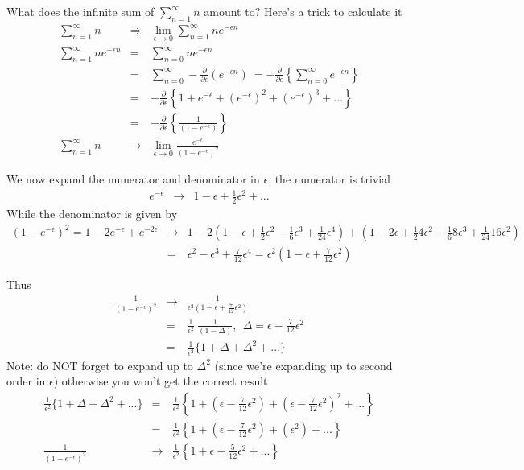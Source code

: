 \documentclass[aps,preprint,preprintnumbers,nofootinbib,showpacs,prd]{revtex4-1}
\newcommand{\nbea}{\begin{eqnarray*}}
\newcommand{\neea}{\end{eqnarray*}}
\begin{document}
What does the infinite sum of $\sum\limits_{n=1}^{\infty} n$ amount to? Here's a trick to calculate it
%
\nbea
\sum_{n=1}^{\infty} n & \Longrightarrow & \lim_{\epsilon \rightarrow 0} \sum_{n=1}^{\infty} n e^{-\epsilon n} \\
\sum_{n=1}^{\infty} n e^{-\epsilon n} & = & \sum_{n=0}^{\infty} n e^{-\epsilon n} \\
& = & \sum_{n=0}^{\infty} -\frac{\partial}{\partial \epsilon} (e^{-\epsilon n}) ~ = -\frac{\partial}{\partial \epsilon} \left \{ \sum_{n=0}^{\infty}  e^{-\epsilon n} \right \} \\
& = & -\frac{\partial}{\partial \epsilon} \left \{ 1 + e^{-\epsilon} + (e^{-\epsilon})^2 + (e^{-\epsilon})^3 + ... \right \} \\
& = & -\frac{\partial}{\partial \epsilon} \left \{ \frac{1}{(1-e^{-\epsilon})} \right \} \\
\sum_{n=1}^{\infty} n & \rightarrow  & \lim_{\epsilon \rightarrow 0} \frac{e^{-\epsilon}}{(1-e^{-\epsilon})^2}
\neea
%

We now expand the numerator and denominator in $\epsilon$, the numerator is trivial
%
\nbea
e^{-\epsilon} & \rightarrow & 1 - \epsilon + \frac{1}{2} \epsilon^2 + ...
\neea
%
While the denominator is given by
%
\nbea
(1-e^{-\epsilon})^2 = 1 - 2e^{-\epsilon} + e^{-2\epsilon} & \rightarrow & 1 - 2 (1 - \epsilon + \frac{1}{2}\epsilon^2 - \frac{1}{6}\epsilon^3 + \frac{1}{24}\epsilon^4) + (1 - 2\epsilon + \frac{1}{2} 4 \epsilon^2 - \frac{1}{6} 8\epsilon^3 + \frac{1}{24}16\epsilon^2) \\
& = & \epsilon^2 - \epsilon^3 + \frac{7}{12} \epsilon^4  = \epsilon^2(1 - \epsilon + \frac{7}{12}\epsilon^2)
\neea
%

Thus
%
\nbea
\frac{1}{(1-e^{-\epsilon})^2} & \rightarrow & \frac{1}{\epsilon^2(1 - \epsilon + \frac{7}{12}\epsilon^2)} \\
& = & \frac{1}{\epsilon^2} ~\frac{1}{(1 - \Delta)}, ~~\Delta = \epsilon - \frac{7}{12}\epsilon^2 \\
& = & \frac{1}{\epsilon^2} \{ 1 + \Delta + \Delta^2 + ... \}
\neea
%
Note: do NOT forget to expand up to $\Delta^2$ (since we're expanding up to second order in $\epsilon$) otherwise you won't get the correct result
%
\nbea
\frac{1}{\epsilon^2} \{ 1 + \Delta + \Delta^2 + ... \} & = & \frac{1}{\epsilon^2} \left \{ 1 + \left( \epsilon - \frac{7}{12}\epsilon^2 \right) + \left( \epsilon - \frac{7}{12}\epsilon^2 \right)^2 + ... \right \} \\
& = & \frac{1}{\epsilon^2} \left \{ 1 + \left( \epsilon - \frac{7}{12}\epsilon^2 \right) + \left( \epsilon^2 \right) + ... \right \} \\
\frac{1}{(1-e^{-\epsilon})^2} & \rightarrow & \frac{1}{\epsilon^2} \left \{ 1 + \epsilon + \frac{5}{12}\epsilon^2 + ... \right \} 
\neea
%
\end{document}
